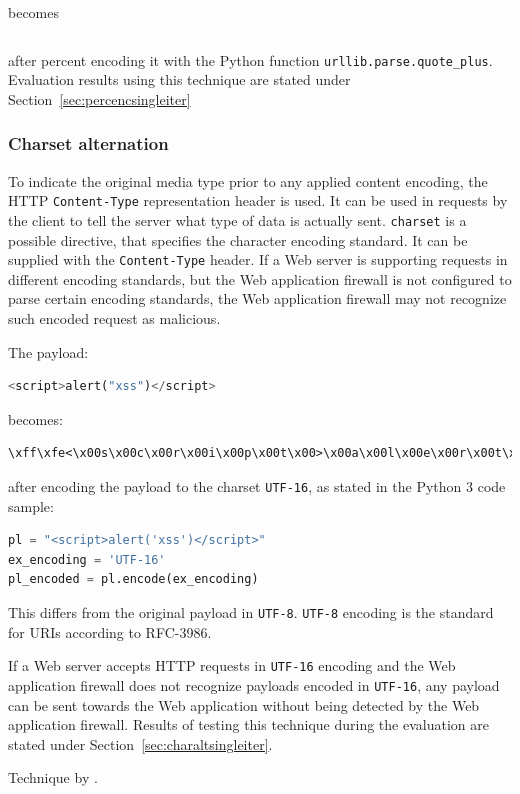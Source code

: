 becomes 

\begin{lstlisting}[style=basicStyle, language=Python]
%3Cscript%3Ealert%28%27XSS%27%29%3C%2Fscript%3E
\end{lstlisting}

after percent encoding it with the Python function \verb|urllib.parse.quote_plus|. Evaluation results using this technique are stated under Section~\ref{sec:percencsingleiter}


\subsubsection{Charset alternation}
To indicate the original media type prior to any applied content encoding, the HTTP \verb|Content-Type| representation header is used.
It can be used in requests by the client to tell the server what type of data is actually sent.
\verb|charset| is a possible directive, that specifies the character encoding standard.
It can be supplied with the \verb|Content-Type| header. \cite{http/contenttype}
If a Web server is supporting requests in different encoding standards, but the Web application firewall is not configured to parse certain encoding standards, the Web application firewall may not recognize such encoded request as malicious.

The payload: 

\begin{lstlisting}[style=basicStyle, language=Python]
<script>alert("xss")</script>
\end{lstlisting}

becomes:

\begin{lstlisting}[style=basicStyle]
\xff\xfe<\x00s\x00c\x00r\x00i\x00p\x00t\x00>\x00a\x00l\x00e\x00r\x00t\x00(\x00'\x00x\x00s\x00s\x00'\x00)\x00<\x00/\x00s\x00c\x00r\x00i\x00p\x00t\x00>\x00
\end{lstlisting}

after encoding the payload to the charset \verb|UTF-16|, as stated in the Python 3 code sample:

\begin{lstlisting}[style=basicStyle, language=Python]
pl = "<script>alert('xss')</script>"
ex_encoding = 'UTF-16'
pl_encoded = pl.encode(ex_encoding)
\end{lstlisting}

This differs from the original payload in \verb|UTF-8|. \verb|UTF-8| encoding is the standard for URIs according to RFC-3986. \cite{rfc3986} 

If a Web server accepts HTTP requests in \verb|UTF-16| encoding and the Web application firewall does not recognize payloads encoded in \verb|UTF-16|, any payload can be sent towards the Web application without being detected by the Web application firewall. Results of testing this technique during the evaluation are stated under Section~\ref{sec:charaltsingleiter}.

Technique by \cite{medium/allypetitt}.
